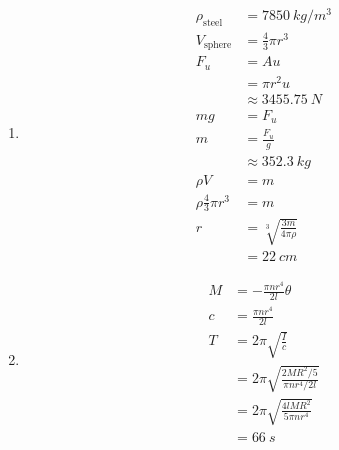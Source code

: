 \documentclass{article}
\begin{document}
\subsection{}

\begin{enumerate}
  \item

        \begin{align*}
          \rho_\text{steel}        & = \qty{7850}{kg/m^3}               \\
          V_\text{sphere}          & = \frac{4}{3} \pi r^3              \\
          F_u                      & = A u                              \\
                                   & = \pi r^2 u                        \\
                                   & \approx \qty{3455.75}{N}           \\
          m g                      & = F_u                              \\
          m                        & = \frac{F_u}{g}                    \\
                                   & \approx \qty{352.3}{kg}            \\
          \rho V                   & = m                                \\
          \rho \frac{4}{3} \pi r^3 & = m                                \\
          r                        & = \sqrt[3]{\frac{3 m}{4 \pi \rho}} \\
                                   & = \qty{22}{cm}
        \end{align*}

  \item

        \begin{align*}
          M & = -\frac{\pi n r^4}{2 l} \theta                    \\
          c & = \frac{\pi n r^4}{2 l}                            \\
          T & = 2 \pi \sqrt{\frac{I}{c}}                         \\
            & = 2 \pi \sqrt{\frac{2 M R^2 / 5}{\pi n r^4 / 2 l}} \\
            & = 2 \pi \sqrt{\frac{4 l M R^2}{5 \pi n r^4}}       \\
            & = \qty{66}{s}
        \end{align*}
\end{enumerate}
\end{document}
